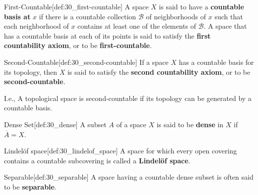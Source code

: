 \begin{defBox}{First-Countable}[def:30_first-countable]
    A space \( X \) is said to have a \textbf{countable basis at} \( x \) if
    there is a countable collection \( \mathcal{B} \) of neighborhoods of
    \( x \) such that each neighborhood of \( x \) contains at least one of the
    elements of \( \mathcal{B} \).
    A space that has a countable basis at each of its points is said to 
    satisfy the \textbf{first countability axiom}, or to be 
    \textbf{first-countable}.
\end{defBox}

\begin{defBox}{Second-Countable}[def:30_second-countable]
    If a space \( X \) has a countable basis for its topology, then \( X \) is
    said to satisfy the \textbf{second countability axiom}, or to be 
    \textbf{second-countable}.

    \baseSkip

    I.e., A topological space is second-countable if its topology can be
    generated by a countable basis.
\end{defBox}

\begin{defBox}{Dense Set}[def:30_dense]
    A subset \( A \) of a space \( X \) is said to be \textbf{dense} in \( X \)
    if \( \overline{ A } = X \).
\end{defBox}

\begin{defBox}{Lindel\"{o}f space}[def:30_lindelof_space]
    A space for which every open covering contains a countable subcovering
    is called a \textbf{Lindel\"{o}f space}.
\end{defBox}

\begin{defBox}{Separable}[def:30_separable]
    A space having a countable dense subset is often said to be 
    \textbf{separable}.
\end{defBox}